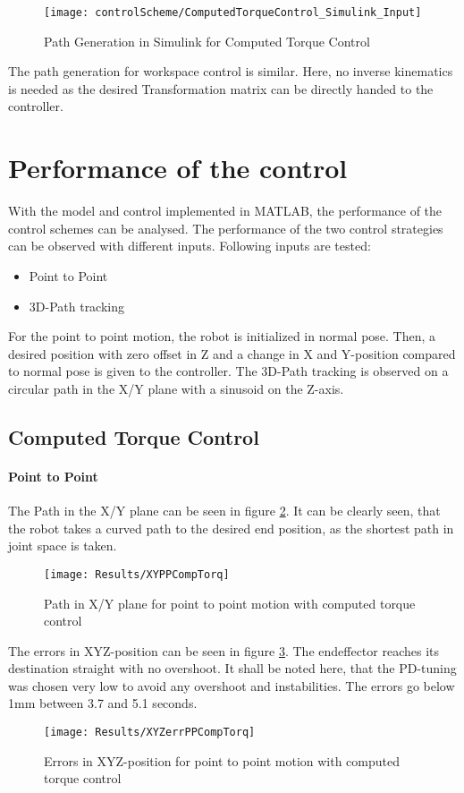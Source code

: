 \begin{figure}[H]
	\texttt{[image: controlScheme/ComputedTorqueControl\_Simulink\_Input]}
	\caption{Path Generation in Simulink for Computed Torque Control}
	\label{fig:PathGen}
\end{figure}

The path generation for workspace control is similar. Here, no inverse kinematics is needed as the desired Transformation matrix can be directly handed to the controller. 

\section{Performance of the control}

With the model and control implemented in MATLAB, the performance of the control schemes can be analysed.
The performance of the two control strategies can be observed with different inputs.
Following inputs are tested:
\begin{itemize}
	\item Point to Point
	\item 3D-Path tracking
\end{itemize}
For the point to point motion, the robot is initialized in normal pose. Then, a desired position with zero offset in Z and a change in X and Y-position compared to normal pose is given to the controller.
The 3D-Path tracking is observed on a circular path in the X/Y plane with a sinusoid on the Z-axis.


\subsection{Computed Torque Control}

\paragraph{Point to Point}
The Path in the X/Y plane can be seen in figure  \ref{fig:XYPPCompTorq}. 
It can be clearly seen, that the robot takes a curved path to the desired end position, as the shortest path in joint space is taken.
\begin{figure}[H]
	\texttt{[image: Results/XYPPCompTorq]}
	\caption{Path in X/Y plane for point to point motion with computed torque control}
	\label{fig:XYPPCompTorq}
\end{figure}
The errors in XYZ-position can be seen in figure \ref{fig:XYZerrPPCompTorq}. %
The endeffector reaches its destination straight with no overshoot. It shall be noted here, that the PD-tuning was chosen very low to avoid any overshoot and instabilities. The errors go below 1mm between 3.7 and 5.1 seconds.
\begin{figure}[H]
	\texttt{[image: Results/XYZerrPPCompTorq]}
	\caption{Errors in XYZ-position for point to point motion with computed torque control}
	\label{fig:XYZerrPPCompTorq}
\end{figure}


